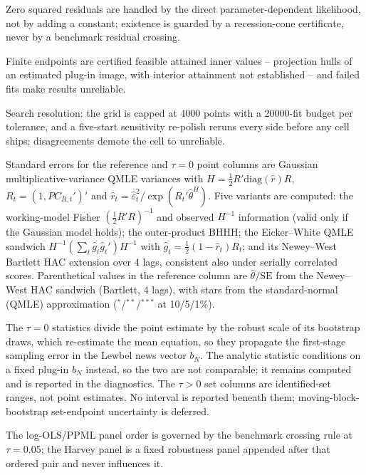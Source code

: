\begin{table}[!htbp]
\begin{threeparttable}
\begin{tablenotes}[flushleft]
\item Zero squared residuals are handled by the direct parameter-dependent likelihood, not by adding a constant; existence is guarded by a recession-cone certificate, never by a benchmark residual crossing.
\item Finite endpoints are certified feasible attained inner values -- projection hulls of an estimated plug-in image, with interior attainment not established -- and failed fits make results unreliable.
\item Search resolution: the grid is capped at 4000 points with a 20000-fit budget per tolerance, and a five-start sensitivity re-polish reruns every side before any cell ships; disagreements demote the cell to unreliable.
\item Standard errors for the reference and $\tau{=}0$ point columns are Gaussian multiplicative-variance QMLE variances with $H = \frac{1}{2}R'\mathrm{diag}(\hat r)R$, $R_t = (1, PC_{R,t}')'$ and $\hat r_t = \hat\varepsilon_t^2 / \exp(R_t'\hat\theta^{H})$. Five variants are computed: the working-model Fisher $(\frac{1}{2}R'R)^{-1}$ and observed $H^{-1}$ information (valid only if the Gaussian model holds); the outer-product BHHH; the Eicker--White QMLE sandwich $H^{-1} (\sum_t \hat g_t \hat g_t')H^{-1}$ with $\hat g_t = \frac{1}{2}(1 - \hat r_t)R_t$; and its Newey--West Bartlett HAC extension over 4 lags, consistent also under serially correlated scores. Parenthetical values in the reference column are $\hat\theta/\mathrm{SE}$ from the Newey--West HAC sandwich (Bartlett, 4 lags), with stars from the standard-normal (QMLE) approximation ($^{*}$/$^{**}$/$^{***}$ at 10/5/1\%).
\item The $\tau{=}0$ statistics divide the point estimate by the robust scale of its bootstrap draws, which re-estimate the mean equation, so they propagate the first-stage sampling error in the Lewbel news vector $b_N$. The analytic statistic conditions on a fixed plug-in $b_N$ instead, so the two are not comparable; it remains computed and is reported in the diagnostics. The $\tau{>}0$ set columns are identified-set ranges, not point estimates. No interval is reported beneath them; moving-block-bootstrap set-endpoint uncertainty is deferred.
\item The log-OLS/PPML panel order is governed by the benchmark crossing rule at $\tau{=}0.05$; the Harvey panel is a fixed robustness panel appended after that ordered pair and never influences it.
\end{tablenotes}
\end{threeparttable}
\end{table}
